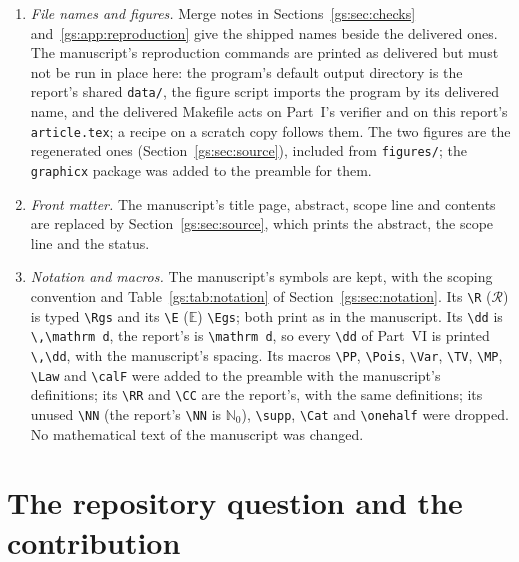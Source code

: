 \documentclass[11pt,a4paper]{article}
\numberwithin{equation}{section}
\theoremstyle{definition}
\theoremstyle{remark}
\newcommand{\NN}{\mathbb N_0}
\newcommand{\CC}{\mathbb C}
\newcommand{\dd}{\mathrm d}
\newcommand{\E}{\mathsf E}
\newcommand{\RR}{\mathbb R}
\newcommand{\Rgs}{\mathcal R}
\newcommand{\Egs}{\mathbb E}
\newcommand{\PP}{\mathbb P}
\newcommand{\Pois}{\operatorname{Pois}}
\newcommand{\Var}{\operatorname{Var}}
\newcommand{\TV}{d_{\mathrm{TV}}}
\newcommand{\MP}{\mathrm{MP}_1}
\newcommand{\Law}{\mathcal L}
\newcommand{\calF}{\mathcal F}
\begin{document}
\begin{enumerate}[leftmargin=*,itemsep=2pt]
 the pinned article's ``Part~I, explicit coefficients and the
 fixed-parameter scope of its asymptotics; Part~I's growing-shift agenda;
 Part~IV's fixed multiplicity limitations''; the second said that those
 files ``distinguish existing fixed-multiplicity endpoint and nonendpoint
 work from the growing-shift question''.  Both pointed to
 \nolinkurl{SOURCES.md}, shipped as
 \nolinkurl{06-growing-shifts-SOURCES.md}.
\item \emph{File names and figures.}  Merge notes in
 Sections~\ref{gs:sec:checks} and~\ref{gs:app:reproduction} give the shipped
 names beside the delivered ones.  The manuscript's reproduction commands
 are printed as delivered but must not be run in place here: the program's
 default output directory is the report's shared \nolinkurl{data/}, the
 figure script imports the program by its delivered name, and the delivered
 Makefile acts on Part~I's verifier and on this report's
 \nolinkurl{article.tex}; a recipe on a scratch copy follows them.  The two
 figures are the regenerated ones (Section~\ref{gs:sec:source}), included
 from \nolinkurl{figures/}; the \texttt{graphicx} package was added to the
 preamble for them.
\item \emph{Front matter.}  The manuscript's title page, abstract, scope
 line and contents are replaced by Section~\ref{gs:sec:source}, which prints
 the abstract, the scope line and the status.
\item \emph{Notation and macros.}  The manuscript's symbols are kept, with
 the scoping convention and Table~\ref{gs:tab:notation} of
 Section~\ref{gs:sec:notation}.  Its \verb|\R| ($\mathcal R$) is typed
 \verb|\Rgs| and its \verb|\E| ($\mathbb E$) \verb|\Egs|; both print as in
 the manuscript.  Its \verb|\dd| is \verb|\,\mathrm d|, the report's is
 \verb|\mathrm d|, so every \verb|\dd| of Part~VI is printed \verb|\,\dd|,
 with the manuscript's spacing.  Its macros \verb|\PP|, \verb|\Pois|,
 \verb|\Var|, \verb|\TV|, \verb|\MP|, \verb|\Law| and \verb|\calF| were
 added to the preamble with the manuscript's definitions; its \verb|\RR| and
 \verb|\CC| are the report's, with the same definitions; its unused
 \verb|\NN| (the report's \verb|\NN| is $\NN$), \verb|\supp|, \verb|\Cat|
 and \verb|\onehalf| were dropped.  No mathematical text of the manuscript
 was changed.
\end{enumerate}

\section{The repository question and the contribution}
\label{gs:sec:context}
\end{document}
